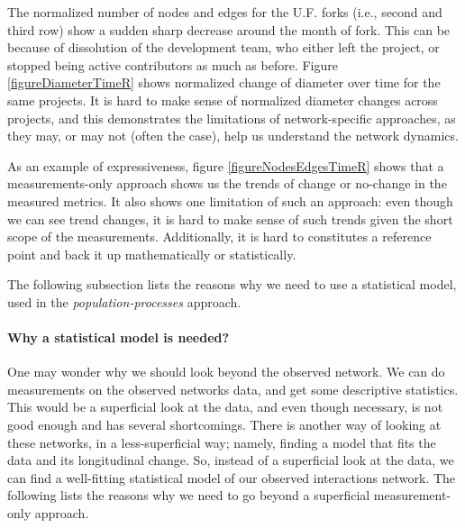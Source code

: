 \documentclass[12pt]{report}
\begin{document}
The normalized number of nodes and edges for the U.F. forks (i.e., second and third row) show a sudden sharp decrease around the month of fork. This can be because of dissolution of the development team, who either left the project, or stopped being active contributors as much as before. Figure  \ref{figureDiameterTimeR} shows normalized change of diameter over time for the same projects. It is hard to make sense of normalized diameter changes across projects, and this demonstrates the limitations of network-specific approaches, as they may, or may not (often the case), help us understand the network dynamics.

As an example of expressiveness, figure \ref{figureNodesEdgesTimeR} shows that a measurements-only approach shows us the trends of change or no-change in the measured metrics. It also shows one limitation of such an approach: even though we can see trend changes, it is hard to make sense of such trends given the short scope of the measurements. Additionally, it is hard to constitutes a reference point and back it up mathematically or statistically.

The following subsection lists the reasons why we need to use a statistical model, used in the \textit{population-processes} approach.

\paragraph*{Why a statistical model is needed?}
One may wonder why we should look beyond the observed network. We can do measurements on the observed networks data, and get some descriptive statistics. This would be a superficial look at the data, and even though necessary, is not good enough and has several shortcomings. 
There is another way of looking at these networks, in a less-superficial way; namely, finding a model that fits the data and its longitudinal change. So, instead of a superficial look at the data, we can find a well-fitting statistical model of our observed interactions network. The following lists the reasons why we need to go beyond a superficial measurement-only approach. 
\end{document}
